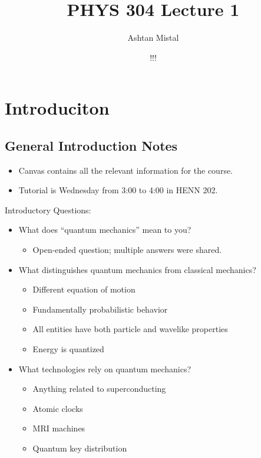 \documentclass{article}
\title{PHYS 304 Lecture 1}
\author{Ashtan Mistal}
\date{!!!}
\begin{document}
\ifstandalone
\maketitle
\fi

\graphicspath{{./Lecture01/}}

\section{Introduciton}

\subsection{General Introduction Notes}

\begin{itemize}
    \item Canvas contains all the relevant information for the course. 
    \item Tutorial is Wednesday from 3:00 to 4:00 in HENN 202. 
\end{itemize}

Introductory Questions:

\begin{itemize}
    \item What does “quantum mechanics” mean to you?
    
    \begin{itemize}
        \item Open-ended question; multiple answers were shared. 
    \end{itemize}
    \item What distinguishes quantum mechanics from classical mechanics?
    \begin{itemize}
        \item Different equation of motion
        \item Fundamentally probabilistic behavior
        \item All entities have both particle and wavelike properties
        \item Energy is quantized
    \end{itemize}
    
    \item What technologies rely on quantum mechanics?
    
    \begin{itemize}
        \item Anything related to superconducting
        \item Atomic clocks
        \item MRI machines
        \item Quantum key distribution
    \end{itemize}

\end{itemize}
\end{document}
